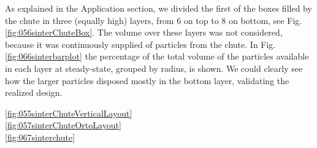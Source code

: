 As explained in the Application section, we divided the first of the boxes
filled by the chute in three (equally high) layers, from 6 on top to 8 
on bottom, see Fig. \ref{fig:056sinterChuteBox}. 
The volume over these layers was not considered, because it was continuously 
supplied of particles from the chute. In Fig. \ref{fig:066sinterbarplot} the
percentage of the total volume of the particles available in each layer at steady-state, 
grouped by radius, is shown. 
We could clearly see how the larger particles disposed mostly 
in the bottom layer, validating the realized design.



\ref{fig:055sinterChuteVerticalLayout} \\





\ref{fig:057sinterChuteOrtoLayout} \\


\ref{fig:067sinterchute}\\




